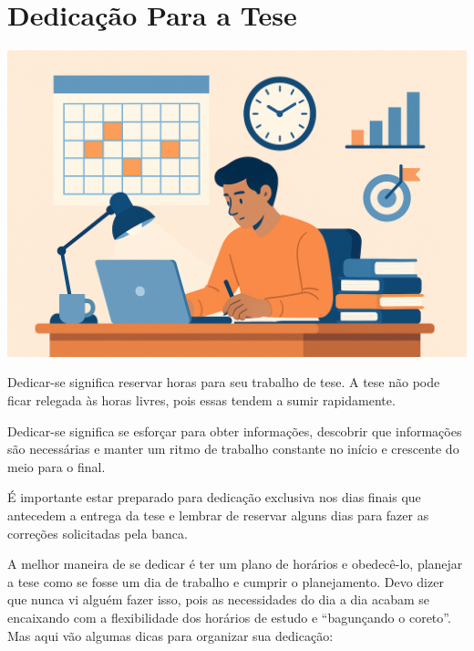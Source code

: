 \chapter{Dedicação Para a Tese}

\begin{center}
\includegraphics[width=0.5\linewidth]{Images/dedicacao.png}    
\end{center}
\vspace{0.5cm}





Dedicar-se significa reservar horas para seu trabalho de tese. A tese não pode ficar relegada às horas livres, pois essas tendem a sumir rapidamente. 


Dedicar-se significa se esforçar para obter informações, descobrir que informações são necessárias e manter um ritmo de trabalho constante no início e crescente do meio para o final. 


É importante estar preparado para dedicação exclusiva nos dias finais que antecedem a entrega da tese e lembrar de reservar alguns dias para fazer as correções solicitadas pela banca.


A melhor maneira de se dedicar é ter um plano de horários e obedecê-lo, planejar a tese como se fosse um dia de trabalho e cumprir o planejamento. Devo dizer que nunca vi alguém fazer isso, pois as necessidades do dia a dia acabam se encaixando com a flexibilidade dos horários de estudo e “bagunçando o coreto”. Mas aqui vão algumas dicas para organizar sua dedicação:

